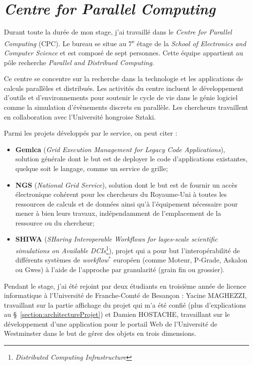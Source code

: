 \section{\textit{Centre for Parallel Computing}}

Durant toute la dur\'ee de mon stage, j'ai travaill\'e dans le \textit{Centre for Parallel Computing} (CPC).
Le bureau se situe au 7\textsuperscript{e} \'etage de la \textit{School of Electronics and Computer Science} et est compos\'e de sept personnes.
Cette \'equipe appartient au p\^ole recherche \textit{Parallel and Distribued Computing}.

Ce centre se concentre sur la recherche dans la technologie et les applications de calculs parall\`eles et distribu\'es.
Les activit\'es du centre incluent le d\'eveloppement d'outils et d'environnements pour soutenir le cycle de vie dans le g\'enie logiciel comme la simulation d'\'ev\`enements discrets en parall\`ele.
Les chercheurs travaillent en collaboration avec l'Universit\'e hongroise Sztaki.

\noindent Parmi les projets d\'evelopp\'es par le service, on peut citer :

\begin{itemize}
	\item \textbf{Gemlca} (\textit{Grid Execution Management for Legacy Code Applications}), solution g\'en\'erale dont le but est de deployer le code d'applications existantes, quelque soit le langage, comme un service de grille;
	\item \textbf{NGS} (\textit{National Grid Service}), solution dont le but est de fournir un acc\`es \'electronique coh\'erent pour les chercheurs du Royaume-Uni \`a toutes les ressources de calculs et de donn\'ees ainsi qu'\`a l'\'equipement n\'ecessaire pour mener \`a bien leurs travaux, ind\'ependamment de l'emplacement de la ressource ou du chercheur;
	\item \textbf{SHIWA} (\textit{SHaring Interoperable Workflows for lages-scale scientific simulations on Available DCIs}\protect\footnote{\textit{Distributed Computing Infrastructure}}), projet qui a pour but l'interop\'erabilit\'e de diff\'erents syst\`emes de \textit{workflow}$^*$ europ\'een (comme Moteur, P-Grade, Askalon ou Gwes) \`a l'aide de l'approche par granularit\'e (grain fin ou grossier).

\end{itemize}

\vspace{0.20cm}

Pendant le stage, j'ai \'et\'e rejoint par deux \'etudiants en troisi\`eme ann\'ee de licence informatique \`a l'Universit\'e de Franche-Comt\'e de Besan\c{c}on : Yacine MAGHEZZI, travaillant sur la partie affichage du projet qui m'a \'et\'e confi\'e (plus d'explications au \S~\ref{section:architectureProjet}) et Damien HOSTACHE, travaillant sur le d\'eveloppement d'une application pour le portail Web de l'Universit\'e de Westminster dans le but de g\'erer des objets en trois dimensions.


\clearpage
